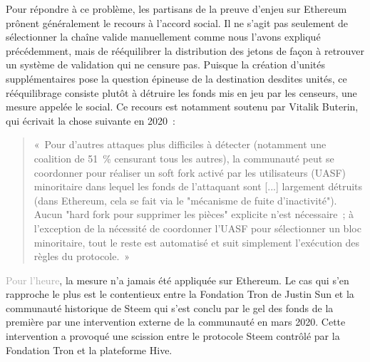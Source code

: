 
Pour répondre à ce problème, les partisans de la preuve d'enjeu sur Ethereum prônent généralement le recours à l'accord social. Il ne s'agit pas seulement de sélectionner la chaîne valide manuellement comme nous l'avons expliqué précédemment, mais de rééquilibrer la distribution des jetons de façon à retrouver un système de validation qui ne censure pas. Puisque la création d'unités supplémentaires pose la question épineuse de la destination desdites unités, ce rééquilibrage consiste plutôt à détruire les fonds mis en jeu par les censeurs, une mesure appelée le  social. Ce recours est notamment soutenu par Vitalik Buterin, qui écrivait la chose suivante en 2020~:

\begin{quote}
«~Pour d'autres attaques plus difficiles à détecter (notamment une coalition de 51~\% censurant tous les autres), la communauté peut se coordonner pour réaliser un soft fork activé par les utilisateurs (UASF) minoritaire dans lequel les fonds de l'attaquant sont [...] largement détruits (dans Ethereum, cela se fait via le "mécanisme de fuite d'inactivité"). Aucun "hard fork pour supprimer les pièces" explicite n'est nécessaire~; à l'exception de la nécessité de coordonner l'UASF pour sélectionner un bloc minoritaire, tout le reste est automatisé et suit simplement l'exécution des règles du protocole.~»
\end{quote}


\textcolor{darkgray}{Pour l'heure}, la mesure n'a jamais été appliquée sur Ethereum. Le cas qui s'en rapproche le plus est le contentieux entre la Fondation Tron de Justin Sun et la communauté historique de Steem qui s'est conclu par le gel des fonds de la première par une intervention externe de la communauté en mars 2020. Cette intervention a provoqué une scission entre le protocole Steem contrôlé par la Fondation Tron et la plateforme Hive.

